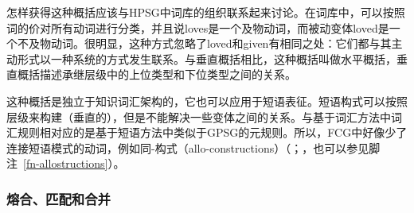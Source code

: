 怎样获得这种概括应该与HPSG中词库的组织联系起来讨论\citep{Flickinger87,Meurers2001a}。在词库中，可以按照词的价对所有动词进行分类，并且说loves是一个及物动词，而被动变体loved是一个不及物动词。很明显，这种方式忽略了loved和given有相同之处：它们都与其主动形式以一种系统的方式发生联系。与垂直概括相比，这种概括叫做水平概括，垂直概括描述承继层级中的上位类型和下位类型之间的关系。

这种概括是独立于知识词汇架构的，它也可以应用于短语表征。短语构式可以按照层级来构建（垂直的），但是不能解决一些变体之间的关系。与基于词汇方法中词汇规则相对应的是基于短语方法中类似于GPSG的元规则。所以，FCG中好像少了连接短语模式的动词，例如同-构式（allo-constructions）（\citealp{Cappelle2006a}；\citealp[]{Goldberg2014a}，也可以参见脚注~\ref{fn-allostructions}）。

\subsubsection{熔合、匹配和合并}

